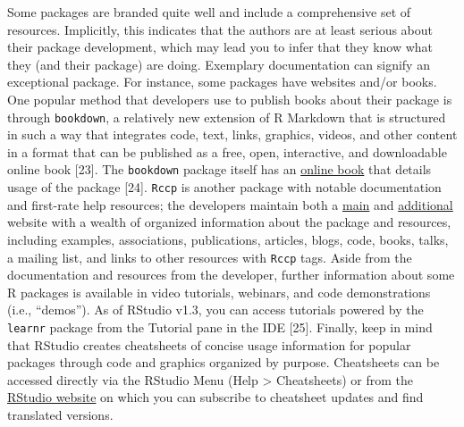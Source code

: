 \documentclass[10pt,letterpaper]{article}
\begin{document}
Some packages are branded quite well and include a comprehensive set of
resources. Implicitly, this indicates that the authors are at least
serious about their package development, which may lead you to infer
that they know what they (and their package) are doing. Exemplary
documentation can signify an exceptional package. For instance, some
packages have websites and/or books. One popular method that developers
use to publish books about their package is through \texttt{bookdown}, a
relatively new extension of R Markdown that is structured in such a way
that integrates code, text, links, graphics, videos, and other content
in a format that can be published as a free, open, interactive, and
downloadable online book {[}23{]}. The \texttt{bookdown} package itself
has an \href{https://bookdown.org/yihui/bookdown/}{online book} that
details usage of the package {[}24{]}. \texttt{Rccp} is another package
with notable documentation and first-rate help resources; the developers
maintain both a \href{http://www.rcpp.org/}{main} and
\href{http://dirk.eddelbuettel.com/code/rcpp.html}{additional} website
with a wealth of organized information about the package and resources,
including examples, associations, publications, articles, blogs, code,
books, talks, a mailing list, and links to other resources with
\texttt{Rccp} tags. Aside from the documentation and resources from the
developer, further information about some R packages is available in
video tutorials, webinars, and code demonstrations (i.e., ``demos''). As
of RStudio v1.3, you can access tutorials powered by the \texttt{learnr}
package from the Tutorial pane in the IDE {[}25{]}. Finally, keep in
mind that RStudio creates cheatsheets of concise usage information for
popular packages through code and graphics organized by purpose.
Cheatsheets can be accessed directly via the RStudio Menu (Help
\textgreater{} Cheatsheets) or from the
\href{https://rstudio.com/resources/cheatsheets/}{RStudio website} on
which you can subscribe to cheatsheet updates and find translated
versions.
\end{document}
